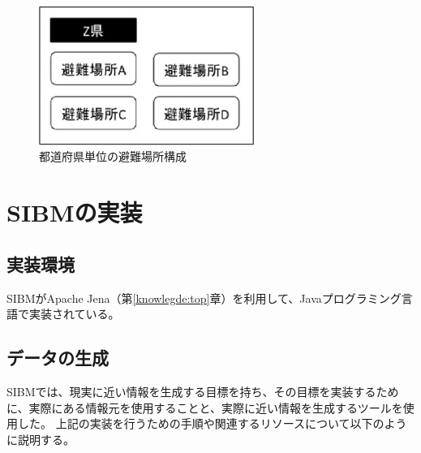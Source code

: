 \begin{figure}[h!]
 	\begin{center}
 		\includegraphics[width=70mm]{./images/sibm_prefecture.eps}
 		\caption{都道府県単位の避難場所構成}
 		\label{fig:sibm_prefecture}
 	\end{center}
\end{figure}

\section{SIBMの実装}
\label{sibm:implements}

\subsection{実装環境}

SIBMがApache Jena（第\ref{knowlegde:top}章）を利用して、Javaプログラミング言語で実装されている。

\subsection{データの生成}

SIBMでは、現実に近い情報を生成する目標を持ち、その目標を実装するために、実際にある情報元を使用することと、実際に近い情報を生成するツールを使用した。
上記の実装を行うための手順や関連するリソースについて以下のように説明する。

